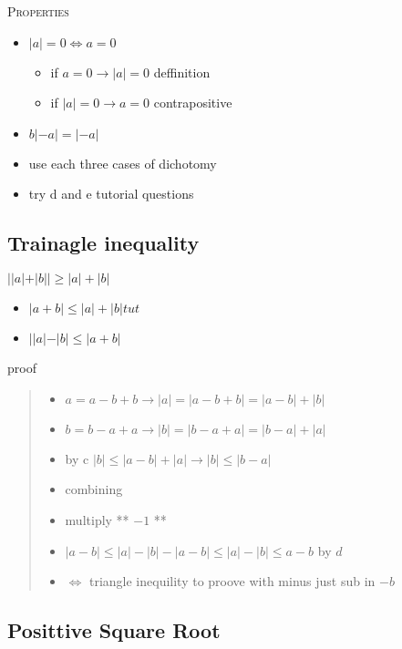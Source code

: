 \documentclass{tufte-book}
\providecommand{\tightlist}{%
  \setlength{\itemsep}{0pt}\setlength{\parskip}{0pt}}
\begin{document}
\textsc{Properties}

\begin{itemize}
\item
  \(|a| = 0 \Leftrightarrow a = 0\)

  \begin{itemize}
  \tightlist
  \item
    if \(a = 0 \to |a| = 0\) deffinition
  \item
    if \(|a| = 0 \to a = 0\) contrapositive
  \end{itemize}
\item
  \(b |-a | = |-a|\)
\item
  use each three cases of dichotomy
\item
  try d and e tutorial questions
\end{itemize}

\hypertarget{trainagle-inequality}{%
\subsection{Trainagle inequality}\label{trainagle-inequality}}

\(||a|+|b|| \geq |a| + |b|\)

\begin{itemize}
\tightlist
\item
  \(|a + b| \leq |a| + |b| tut\)
\item
  \(| |a| - |b| \leq |a + b|\)
\end{itemize}

proof

\begin{quote}
\begin{itemize}
\tightlist
\item
  \(a = a - b + b \to |a| = |a - b + b| = |a-b| + |b|\)
\item
  \(b = b - a + a \to |b| = |b - a + a| = |b-a| + |a|\)
\item
  by c \(|b| \leq |a - b| + |a| \to |b| \leq |b - a|\)
\item
  combining
\item
  multiply ** \(-1\) **
\item
  \(|a - b| \leq |a| - |b| - |a - b| \leq |a| - |b| \leq a-b\)
  \textbar{} by \(d\)
\item
  \(\Leftrightarrow\) triangle inequility to proove with minus just sub
  in \(-b\)
\end{itemize}
\end{quote}\hypertarget{posittive-square-root}{%
\subsection{Posittive Square Root}\label{posittive-square-root}}
\end{document}

